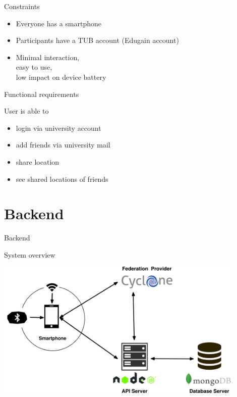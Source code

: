 \documentclass[11pt]{beamer}
\begin{document}
\begin{frame}{Constraints}

  \begin{itemize}

    \item Everyone has a smartphone
  	\item Participants have a TUB account (Edugain account)
  	\item Minimal interaction,\\easy to use,\\low impact on device battery

  \end{itemize}

\end{frame}


\begin{frame}{Functional requirements}

  User is able to

  \vspace{0.25cm}

  \begin{itemize}
    \item login via university account
    \item add friends via university mail
    \item share location
    \item see shared locations of friends
  \end{itemize}

\end{frame}


\section{Backend}

\begin{frame}{}

  \begin{center}

    {\Huge Backend}

  \end{center}

\end{frame}


\begin{frame}{System overview}

  \begin{center}
    \includegraphics[width=0.9\textwidth]{architecture_v02}
  \end{center}

\end{frame}
\end{document}
